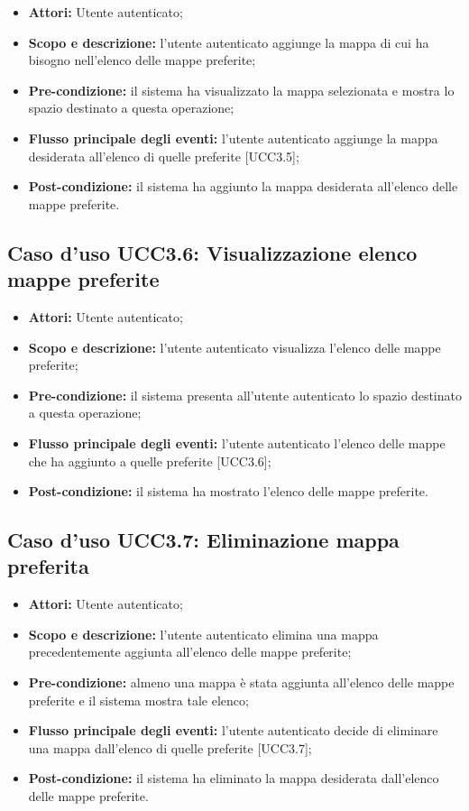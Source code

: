 \begin{itemize}
\item \textbf{Attori:} Utente autenticato;
\item \textbf{Scopo e descrizione:} l'utente autenticato aggiunge la mappa di cui ha bisogno nell'elenco delle mappe preferite;
\item \textbf{Pre-condizione:} il sistema ha visualizzato la mappa selezionata e mostra lo spazio destinato a questa operazione;
\item \textbf{Flusso principale degli eventi:} l'utente autenticato aggiunge la mappa desiderata all'elenco di quelle preferite [UCC3.5];
\item \textbf{Post-condizione:} il sistema ha aggiunto la mappa desiderata all'elenco delle mappe preferite.
\end{itemize}

\subsection{Caso d'uso UCC3.6: Visualizzazione elenco mappe preferite}

\begin{itemize}
\item \textbf{Attori:} Utente autenticato;
\item \textbf{Scopo e descrizione:} l'utente autenticato visualizza l'elenco delle mappe preferite;
\item \textbf{Pre-condizione:} il sistema presenta all'utente autenticato lo spazio destinato a questa operazione;
\item \textbf{Flusso principale degli eventi:} l'utente autenticato l'elenco delle mappe che ha aggiunto a quelle preferite [UCC3.6];
\item \textbf{Post-condizione:} il sistema ha mostrato l'elenco delle mappe preferite.
\end{itemize}


\subsection{Caso d'uso UCC3.7: Eliminazione mappa preferita}

\begin{itemize}
\item \textbf{Attori:} Utente autenticato;
\item \textbf{Scopo e descrizione:} l'utente autenticato elimina una mappa precedentemente aggiunta all'elenco delle mappe preferite;
\item \textbf{Pre-condizione:} almeno una mappa è stata aggiunta all'elenco delle mappe preferite e il sistema mostra tale elenco;
\item \textbf{Flusso principale degli eventi:} l'utente autenticato decide di eliminare una mappa dall'elenco di quelle preferite [UCC3.7];
\item \textbf{Post-condizione:} il sistema ha eliminato la mappa desiderata dall'elenco delle mappe preferite.
\end{itemize}


